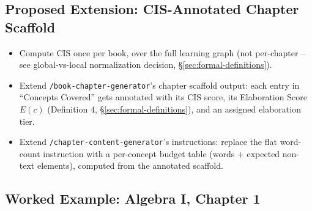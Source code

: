 \subsection{Proposed Extension: CIS-Annotated Chapter Scaffold}
\begin{itemize}
    \item Compute CIS once per book, over the full learning graph (not
          per-chapter -- see global-vs-local normalization decision,
          \S\ref{sec:formal-definitions}).
    \item Extend \texttt{/book-chapter-generator}'s chapter scaffold output: each
          entry in ``Concepts Covered'' gets annotated with its CIS score, its
          Elaboration Score $E(c)$ (Definition 4, \S\ref{sec:formal-definitions}),
          and an assigned elaboration tier.
    \item Extend \texttt{/chapter-content-generator}'s instructions: replace the
          flat word-count instruction with a per-concept budget table (words +
          expected non-text elements), computed from the annotated scaffold.
\end{itemize}

\subsection{Worked Example: Algebra I, Chapter 1}

%
%

